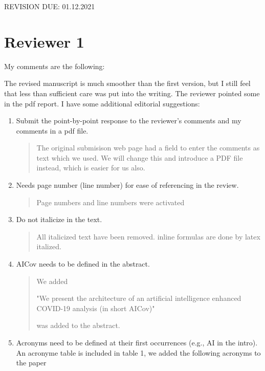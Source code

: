 % 

REVISION DUE: 01.12.2021

\section*{Reviewer 1}

My comments are the following:

The revised manuscript is much smoother than the first version, but I still feel that less than sufficient care was put into the writing. The reviewer pointed some in the pdf report. I have some additional editorial suggestions:

\begin{enumerate}

\item \PROGRESS Submit the point-by-point response to the reviewer's comments and my comments in a pdf file.

\begin{quote}
The original submisison web page had a field to enter the comments as text which we used. We will change this and introduce a PDF file instead, which is easier for us also.
\end{quote}



\item \DONE Needs page number (line number) for ease of referencing in the review.

\begin{quote}
Page numbers and line numbers were activated
\end{quote}


\item \DONE Do not italicize in the text.

\begin{quote}
All italicized text have been removed.
inline formulas are done by latex italized. 
\end{quote}


\item \DONE AICov needs to be defined in the abstract.

\begin{quote}
We added 

"We present the architecture of an artificial intelligence enhanced COVID-19 analysis (in short AICov)" 

was added to the abstract.
\end{quote}


\item \PROGRESS Acronyms need to be defined at their first occurrences (e.g., AI in the intro). An acronyme table is included in table 1, we added the following acronyms to the paper


\end{enumerate}
